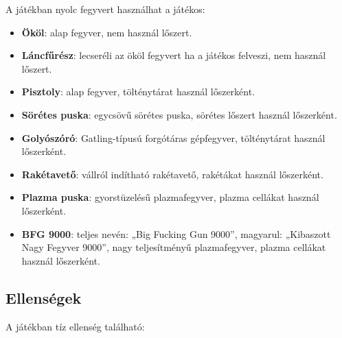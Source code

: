 \documentclass{thesis-ekf}
\theoremstyle{definition}
\theoremstyle{remark}
\begin{document}
A játékban nyolc fegyvert használhat a játékos:

\begin{itemize}
    \item \textbf{Ököl}: alap fegyver, nem használ lőszert.
    \item \textbf{Láncfűrész}: lecseréli az ököl fegyvert ha a játékos felveszi,
        nem használ lőszert.
    \item \textbf{Pisztoly}: alap fegyver, tölténytárat használ lőszerként.
    \item \textbf{Sörétes puska}: egycsövű sörétes puska, sörétes lőszert
        használ lőszerként.
    \item \textbf{Golyószóró}: Gatling-típusú forgótáras gépfegyver,
        tölténytárat használ lőszerként.
    \item \textbf{Rakétavető}: vállról indítható rakétavető, rakétákat használ
        lőszerként.
    \item \textbf{Plazma puska}: gyorstüzelésű plazmafegyver, plazma cellákat
        használ lőszerként.
    \item \textbf{BFG 9000}: teljes nevén: „Big Fucking Gun 9000”, magyarul:
        „Kibaszott Nagy Fegyver 9000”, nagy teljesítményű plazmafegyver, plazma
        cellákat használ lőszerként.
\end{itemize}

\subsection{Ellenségek}

A játékban tíz ellenség található:
\end{document}
